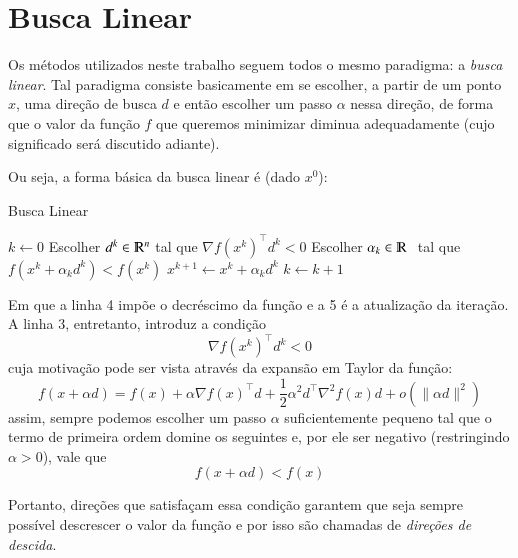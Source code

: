 \documentclass[a4paper,11pt]{article}
\begin{document}
    \newpage
    \section*{Busca Linear}
        Os métodos utilizados neste trabalho seguem todos o mesmo paradigma: a \emph{busca linear}.
        Tal paradigma consiste basicamente em se escolher, a partir de um ponto $x$, uma direção de busca $d$ e então escolher
        um passo $\alpha$ nessa direção, de forma que o valor da função $f$ que queremos
        minimizar diminua adequadamente (cujo significado será discutido adiante).

        Ou seja, a forma básica da busca linear é (dado $x^0$):
        \begin{algorithm}[h]
            \caption{Busca Linear}
            \label{alg:ls}
            \begin{algorithmic}[1]
                \State $k \gets 0$
                    \State Escolher $d^k \in \varmathbb{R}^n$ tal que $\nabla f(x^k)^\top d^k < 0$
                    \State Escolher $\alpha_k \in \varmathbb{R}$\,\, tal que $f(x^k + \alpha_k d^k) < f(x^k)$
                    \State $x^{k+1} \gets x^k + \alpha_k d^k$
                    \State $k \gets k + 1$
                \EndWhile
            \end{algorithmic}
        \end{algorithm}

        Em que a linha 4 impõe o decréscimo da função e a 5 é a atualização da iteração.
        A linha 3, entretanto, introduz a condição
        \begin{equation}
            \label{eq:desc}
            \nabla f(x^k)^\top d^k < 0
        \end{equation}
        cuja motivação pode ser vista através da expansão em Taylor da função:
            $$ f(x + \alpha d) = f(x) + \alpha\nabla f(x)^\top d + \frac{1}{2}\alpha^2d^\top\nabla^2 f(x)d + o(\|\alpha d\|^2)  $$
        assim, sempre podemos escolher um passo $\alpha$ suficientemente pequeno tal que o termo de primeira ordem domine os seguintes
        e, por ele ser negativo (restringindo $\alpha > 0$), vale que
            $$ f(x + \alpha d) < f(x) $$

        Portanto, direções que satisfaçam essa condição garantem que seja sempre possível descrescer o valor da função e por isso
        são chamadas de \emph{direções de descida}.
\end{document}
